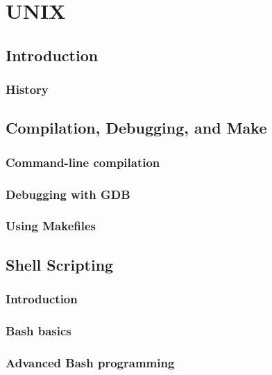 \documentclass[11pt,twoside]{book}
\begin{document}



\part{UNIX}

\chapter{Introduction}

\section{History}



\chapter{Compilation, Debugging, and Make}

\section{Command-line compilation}

\section{Debugging with GDB}

\section{Using Makefiles}



\chapter{Shell Scripting}

\section{Introduction}

\section{Bash basics}

\section{Advanced Bash programming}
\end{document}
